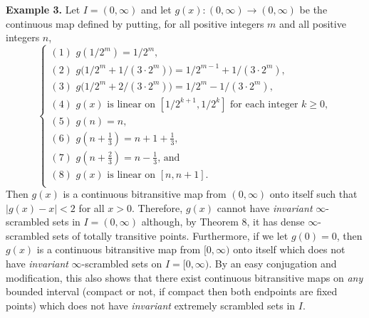 \documentclass[12pt]{article}
\begin{document}
\noindent
{\bf Example 3.} Let $I = (0, \infty)$ and let $g(x) : (0, \infty) \to (0, \infty)$ be the continuous map defined by putting, for all positive integers $m$ and all positive integers $n$, 
$$
\begin{cases}
(1) \,\, g(1/2^m) = 1/2^m, \\
(2) \,\, g\big(1/2^m + 1/(3 \cdot 2^m)\big) = 1/2^{m-1} + 1/(3 \cdot 2^m), \\
(3) \,\, g\big(1/2^m + 2/(3 \cdot 2^m)\big) = 1/2^m - 1/(3 \cdot 2^m), \\
(4) \,\, \text{$g(x)$ is linear on $[1/2^{k+1}, 1/2^k]$ for each integer $k \ge 0$}, \\
(5) \,\, g(n) = n, \\
(6) \,\, g(n+\frac 13) = n+1+\frac 13, \\
(7) \,\, g(n+\frac 23) = n - \frac 13, \, \text{and} \\
(8) \,\, \text{$g(x)$ is linear on $[n, n +1]$}. \\ 
\end{cases}
$$
Then $g(x)$ is a continuous bitransitive map from $(0, \infty)$ onto itself such that $|g(x) - x| < 2$ for all $x > 0$.  Therefore, $g(x)$ cannot have {\it invariant} $\infty$-scrambled sets in $I = (0, \infty)$ although, by Theorem 8, it has dense $\infty$-scrambled sets of totally transitive points.  Furthermore, if we let $g(0) = 0$, then $g(x)$ is a continuous bitransitive map from $[0, \infty)$ onto itself which does not have {\it invariant} $\infty$-scrambled sets on $I = [0, \infty)$.  By an easy conjugation and modification, this also shows that there exist continuous bitransitive maps on {\it any} bounded interval (compact or not, if compact then both endpoints are fixed points) which does not have {\it invariant} extremely scrambled sets in $I$.  
\end{document}
